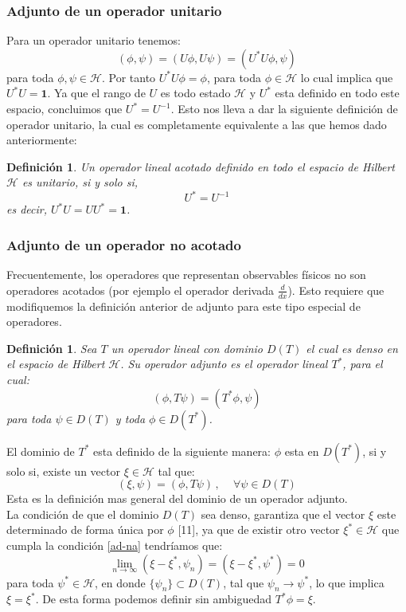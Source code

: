 \documentclass[12pt]{book}
\numberwithin{equation}{chapter}
\newtheorem{definition}[theorem]{Definici\'on}
\def\rar{\rightarrow}
\def\H{\mathcal{H}}
\def\1{\mathbf{1}}
\begin{document}
\subsubsection{Adjunto de un operador unitario}
Para un operador unitario tenemos:
\begin{equation}
( \phi , \psi )= ( U\phi , U\psi )= ( U^{*}U\phi , \psi  )
\end{equation}
para toda $\phi , \psi \in \H$. Por tanto $ U^{*} U \phi = \phi $, para toda $ \phi \in \H $ lo cual implica que $ U^{*}U= \1 $. Ya que el rango de $U$ es todo
estado $\H$ y $U^{*}$ esta definido en todo este espacio, concluimos que $U^{*}= U^{-1}$. Esto nos lleva a dar la siguiente definici\'on de operador unitario, la cual es completamente equivalente a las que hemos dado anteriormente:
\begin{definition}
Un operador lineal acotado definido en todo el espacio de Hilbert $\H$ es unitario, si y solo si,
\begin{equation}
U^{*}= U^{-1} 
\end{equation}
es decir, $ U^{*}U=UU^{*}= \1 $.
\end{definition}

\subsubsection{Adjunto de un operador no acotado}
Frecuentemente, los operadores que representan observables f\'isicos no son operadores acotados (por ejemplo el operador derivada $\frac{d}{dx}$). Esto requiere que modifiquemos la definici\'on anterior de adjunto para este tipo especial de operadores.
\begin{definition}
Sea $T$ un operador lineal con dominio $D(T)$ el cual es denso en el espacio de Hilbert $\H$. Su operador adjunto es el operador lineal $T^{*}$, para el cual:
\begin{equation}
( \phi , T\psi )=( T^{*}\phi ,\psi )
\end{equation}
para toda $ \psi \in D(T) $ y toda $ \phi \in D(T^{*}) $.
\end{definition}

El dominio de $T^{*}$ esta definido de la siguiente manera: $\phi$ esta en $D(T^{*})$, si y solo si, existe un vector $\xi \in \H$ tal que:
\begin{equation}\label{ad-na}
( \xi , \psi )= ( \phi , T \psi ) \,,\,\,\,\,\,\,\, \forall \psi \in D(T)
\end{equation}
Esta es la definici\'on mas general del dominio de un operador adjunto.\\
La condici\'on de que el dominio $D(T)$ sea denso, garantiza que el vector $\xi$ este determinado de forma \'unica por $\phi$ [11], ya que de existir otro vector $\xi^{*} \in \H $ que cumpla la condici\'on \eqref{ad-na} tendr\'iamos que:
$$ \lim_{n \rar \infty} ( \xi-\xi^{*}, \psi_{n} )= ( \xi-\xi^{*}, \psi^{*} )=0 $$
para toda $ \psi^{*} \in \H $, en donde $ \{ \psi_{n} \} \subset D(T) $, tal que $ \psi_{n} \rar \psi^{*} $, lo que implica $ \xi = \xi^{*} $. De esta forma podemos definir sin ambiguedad $T^{*}\phi = \xi $.\\
\end{document}
